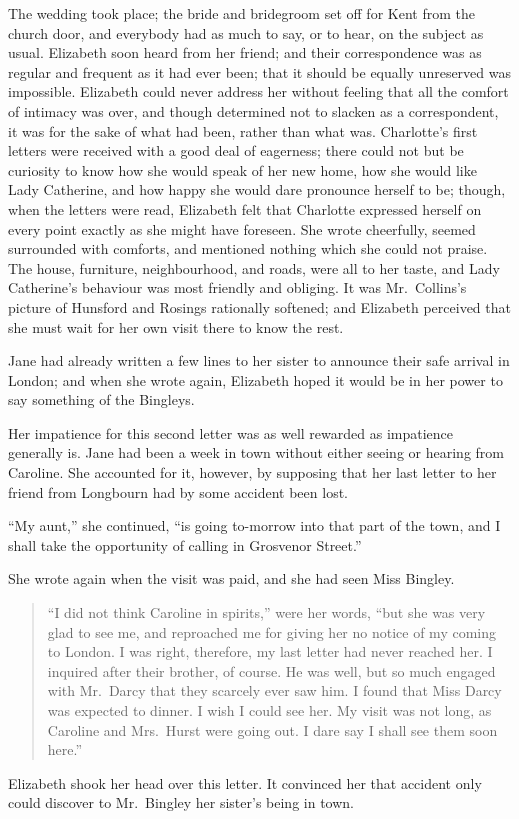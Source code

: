 \documentclass[12pt,english]{book}
\begin{document}
The wedding took place; the bride and bridegroom set off for Kent
from the church door, and everybody had as much to say, or to hear,
on the subject as usual. Elizabeth soon heard from her friend; and
their correspondence was as regular and frequent as it had ever been;
that it should be equally unreserved was impossible. Elizabeth could
never address her without feeling that all the comfort of intimacy
was over, and though determined not to slacken as a correspondent,
it was for the sake of what had been, rather than what was. Charlotte's
first letters were received with a good deal of eagerness; there could
not but be curiosity to know how she would speak of her new home,
how she would like Lady Catherine, and how happy she would dare pronounce
herself to be; though, when the letters were read, Elizabeth felt
that Charlotte expressed herself on every point exactly as she might
have foreseen. She wrote cheerfully, seemed surrounded with comforts,
and mentioned nothing which she could not praise. The house, furniture,
neighbourhood, and roads, were all to her taste, and Lady Catherine's
behaviour was most friendly and obliging. It was Mr.\ Collins's picture
of Hunsford and Rosings rationally softened; and Elizabeth perceived
that she must wait for her own visit there to know the rest.

Jane had already written a few lines to her sister to announce their
safe arrival in London; and when she wrote again, Elizabeth hoped
it would be in her power to say something of the Bingleys.

Her impatience for this second letter was as well rewarded as impatience
generally is. Jane had been a week in town without either seeing or
hearing from Caroline. She accounted for it, however, by supposing
that her last letter to her friend from Longbourn had by some accident
been lost.

{}``My aunt,'' she continued, {}``is going to-morrow into that
part of the town, and I shall take the opportunity of calling in Grosvenor
Street.''

She wrote again when the visit was paid, and she had seen Miss Bingley. 

\begin{quote}
{}``I did not think Caroline in spirits,'' were her words, {}``but
she was very glad to see me, and reproached me for giving her no notice
of my coming to London. I was right, therefore, my last letter had
never reached her. I inquired after their brother, of course. He was
well, but so much engaged with Mr.\ Darcy that they scarcely ever
saw him. I found that Miss Darcy was expected to dinner. I wish I
could see her. My visit was not long, as Caroline and Mrs.\ Hurst
were going out. I dare say I shall see them soon here.''
\end{quote}
Elizabeth shook her head over this letter. It convinced her that accident
only could discover to Mr.\ Bingley her sister's being in town.
\end{document}
